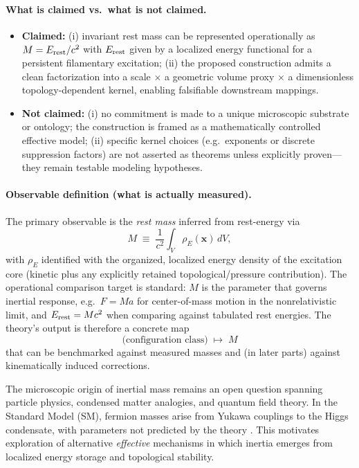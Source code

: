 \documentclass[11pt]{article}
\newcommand{\rhoE}{\rho_{\!E}}\newcommand{\rhoe}{\rho_{\!E}}                           %
\theoremstyle{definition}
\theoremstyle{plain}
\theoremstyle{remark}
\begin{document}
        \paragraph{What is claimed vs.\ what is not claimed.}
        \begin{itemize}
          \item \textbf{Claimed:} (i) invariant rest mass can be represented operationally as $M=E_{\rm rest}/c^2$ with $E_{\rm rest}$ given by a localized energy functional for a persistent filamentary excitation; (ii) the proposed construction admits a clean factorization into a scale $\times$ a geometric volume proxy $\times$ a dimensionless topology-dependent kernel, enabling falsifiable downstream mappings.
          \item \textbf{Not claimed:} (i) no commitment is made to a unique microscopic substrate or ontology; the construction is framed as a mathematically controlled effective model; (ii) specific kernel choices (e.g.\ exponents or discrete suppression factors) are not asserted as theorems unless explicitly proven---they remain testable modeling hypotheses.
        \end{itemize}

        \paragraph{Observable definition (what is actually measured).}
        The primary observable is the \emph{rest mass} inferred from rest-energy via
        \[
        M \;\equiv\; \frac{1}{c^2}\int_V \rhoE(\mathbf{x})\,dV,
        \]
        with $\rhoE$ identified with the organized, localized energy density of the excitation core (kinetic plus any explicitly retained topological/pressure contribution). The operational comparison target is standard: $M$ is the parameter that governs inertial response, e.g.\ $F=Ma$ for center-of-mass motion in the nonrelativistic limit, and $E_{\rm rest}=Mc^2$ when comparing against tabulated rest energies. The theory's output is therefore a concrete map
        \[
        \text{(configuration class)}\;\longmapsto\; M
        \]
        that can be benchmarked against measured masses and (in later parts) against kinematically induced corrections.

            The microscopic origin of inertial mass remains an open question spanning particle physics, condensed matter analogies, and quantum field theory. In the Standard Model (SM), fermion masses arise from Yukawa couplings to the Higgs condensate, with parameters not predicted by the theory \cite{Higgs1964,EnglertBrout1964,Weinberg1967}. This motivates exploration of alternative \emph{effective} mechanisms in which inertia emerges from localized energy storage and topological stability.
\end{document}
